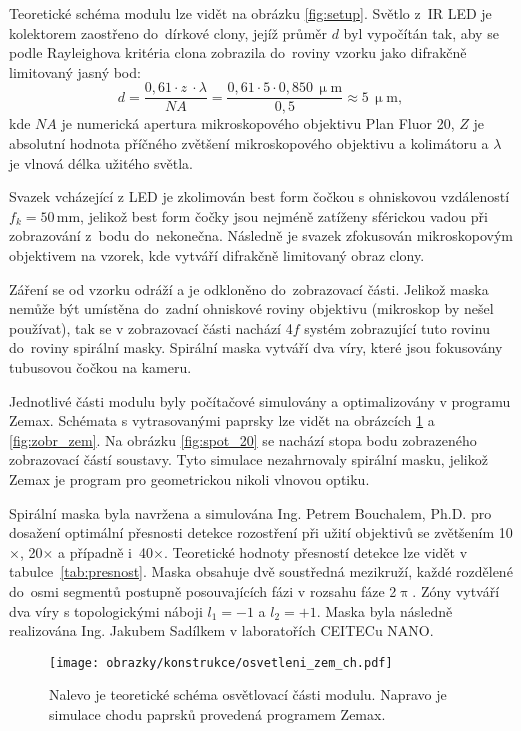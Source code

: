 \documentclass[12pt, a4paper, twoside]{article}
\begin{document}
Teoretické schéma modulu lze vidět na obrázku \ref{fig:setup}. Světlo z~IR LED je kolektorem zaostřeno do~dírkové clony, jejíž průměr $d$ byl vypočítán tak, aby se podle Rayleighova kritéria clona zobrazila do~roviny vzorku jako difrakčně limitovaný jasný bod:
$$ d=\frac{ 0,\!61\cdot z~\cdot \lambda}{N\!A} = \frac{ 0,\!61\cdot 5 \cdot 0,850\,\upmu\mathrm{m}}{0,\!5} \approx 5\, \upmu \mathrm{m}, $$
kde $N\!A$ je numerická apertura mikroskopového objektivu Plan Fluor 20, $Z$ je absolutní hodnota příčného zvětšení mikroskopového objektivu a kolimátoru a $\lambda$ je vlnová délka užitého světla. 

Svazek vcházející z LED je zkolimován best form čočkou s ohniskovou vzdáleností $f_k=50 \,\mathrm{mm}$, jelikož best form čočky jsou nejméně zatíženy sférickou vadou při zobrazování z~bodu do~nekonečna. Následně je svazek zfokusován mikroskopovým objektivem na vzorek, kde vytváří difrakčně limitovaný obraz clony. 

Záření se od vzorku odráží a je odkloněno do~zobrazovací části. Jelikož maska nemůže být umístěna do~zadní ohniskové roviny objektivu (mikroskop by nešel používat), tak se v zobrazovací části nachází 4$f$ systém zobrazující tuto rovinu do~roviny spirální masky. Spirální maska vytváří dva víry, které jsou fokusovány tubusovou čočkou na kameru.

Jednotlivé části modulu byly počítačové simulovány a optimalizovány v programu Zemax. Schémata s vytrasovanými paprsky lze vidět na obrázcích \ref{fig:osv_zem} a \ref{fig:zobr_zem}. Na obrázku \ref{fig:spot_20} se nachází stopa bodu zobrazeného zobrazovací částí soustavy. Tyto simulace nezahrnovaly spirální masku, jelikož Zemax je program pro geometrickou nikoli vlnovou optiku.

Spirální maska byla navržena a simulována Ing. Petrem Bouchalem, Ph.D. pro dosažení optimální přesnosti detekce rozostření při užití objektivů se zvětšením 10$\times$, 20$\times$ a případně i~40$\times$. Teoretické hodnoty přesností detekce lze vidět v tabulce~\ref{tab:presnost}. Maska obsahuje dvě soustředná mezikruží, každé rozdělené do~osmi segmentů postupně posouvajících fázi v rozsahu fáze 2$\uppi$. Zóny vytváří dva víry s topologickými náboji $l_1=-1$ a $l_2=+1$. Maska byla následně realizována Ing. Jakubem Sadílkem v laboratořích CEITECu NANO.

\begin{figure}[t]
  \centering
  \texttt{[image: obrazky/konstrukce/osvetleni\_zem\_ch.pdf]}
  \caption[Schéma a simulace chodu paprsků osvětlovací částí.]{Nalevo je teoretické schéma osvětlovací části modulu. Napravo je simulace chodu paprsků provedená programem Zemax.}
  \label{fig:osv_zem}
\end{figure}
\end{document}
